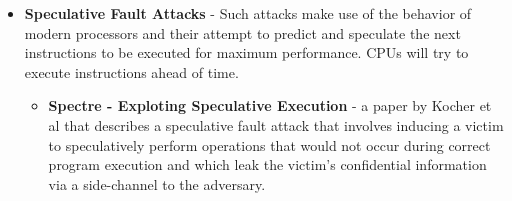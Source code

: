 \begin{itemize}
\begin{itemize}
		
	\end{itemize}

	\item \textbf{Speculative Fault Attacks} - Such attacks make use of the behavior of modern
	processors and their attempt to predict and speculate the next instructions to be executed
	for maximum performance. CPUs will try to execute instructions ahead of time.

	\begin{itemize}

		\item \textbf{Spectre - Exploting Speculative Execution} - a paper by Kocher et al that describes
		a speculative fault attack that involves inducing a victim to speculatively perform operations
		that would not occur during correct program execution and which leak the victim's confidential
		information via a side-channel to the adversary.
		
	\end{itemize}

\end{itemize}